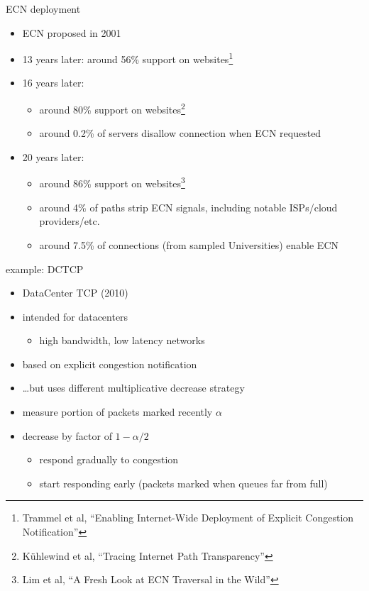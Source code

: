 \begin{frame}{ECN deployment}
    \begin{itemize}
    \item ECN proposed in 2001
    \item 13 years later: around 56\% support on websites\footnote{Trammel et al, ``Enabling Internet-Wide Deployment of Explicit Congestion Notification''}
    \item 16 years later: 
        \begin{itemize}
        \item around 80\% support on websites\footnote{K\"uhlewind et al, ``Tracing Internet Path Transparency''}
        \item around 0.2\% of servers disallow connection when ECN requested
        \end{itemize}
    \item 20 years later:
        \begin{itemize}
        \item around 86\% support on websites\footnote{Lim et al, ``A Fresh Look at ECN Traversal in the Wild''}
        \item around 4\% of paths strip ECN signals, including notable ISPs/cloud providers/etc.
        \item around 7.5\% of connections (from sampled Universities) enable ECN
        \end{itemize}
    \end{itemize}
\end{frame}


\begin{frame}{example: DCTCP}
    \begin{itemize}
    \item DataCenter TCP (2010)
    \item intended for datacenters
        \begin{itemize}
        \item high bandwidth, low latency networks
        \end{itemize}
    \item based on explicit congestion notification
    \item \ldots but uses different multiplicative decrease strategy
    \vspace{.5cm}
    \item measure portion of packets marked recently $\alpha$ 
    \item decrease by factor of $1-\alpha/2$
        \begin{itemize}
        \item respond gradually to congestion
        \item start responding early (packets marked when queues far from full)
        \end{itemize}
    \end{itemize}
\end{frame}
